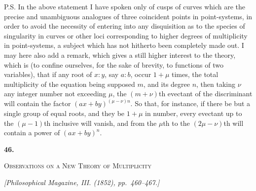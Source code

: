 \documentclass[11pt]{article}
\newcommand{\paperhead}[3]{%
  \clearpage
  \begin{center}
  {\Large\bfseries #1.}\par\vspace{0.85em}
  {\large\scshape #2}\par\vspace{0.6em}
  {\itshape [#3]}\par
  \end{center}\vspace{0.4em}}
\begin{document}
{{P.S. In the above statement I have spoken only of cusps of curves which are the precise and unambiguous analogues of three coincident points in point-systems, in order to avoid the necessity of entering into any disquisition as to the species of singularity in curves or other loci corresponding to higher degrees of multiplicity in point-systems, a subject which has not hitherto been completely made out. I may here also add a remark, which gives a still higher interest to the theory, which is (to confine ourselves, for the sake of brevity, to functions of two variables), that if any root of $x:y$, say $a:b$, occur $1+\mu$ times, the total multiplicity of the equation being supposed $m$, and its degree $n$, then taking $\nu$ any integer number not exceeding $\mu$, the $(m+\nu)$th evectant of the discriminant will contain the factor $(ax+by)^{(\mu-\nu)n}$. So that, for instance, if there be but a single group of equal roots, and they be $1+\mu$ in number, every evectant up to the $(\mu-1)$th inclusive will vanish, and from the $\mu$th to the $(2\mu-\nu)$th will contain a power of $(ax+by)^n$.

\paperhead{46}{Observations on a New Theory of Multiplicity}{Philosophical Magazine, III. (1852), pp.~460--467.}

}}
\end{document}
